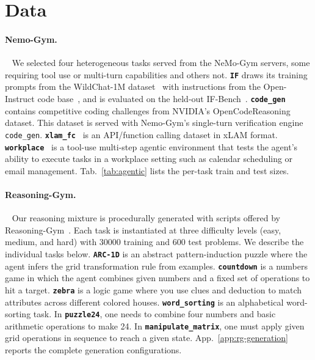 \section{Data}
\label{app:data}
\paragraph{Nemo-Gym.}~\citep{nemogym}
We selected four heterogeneous tasks served from the NeMo-Gym servers, some requiring tool use or multi-turn capabilities and others not.
\textbf{\texttt{IF}} draws its training prompts from the WildChat-1M dataset~\citep{zhao2024wildchat1mchatgptinteraction} with instructions from the Open-Instruct code base~\citep{ahmad2025opencodeinstructlargescaleinstructiontuning}, and is evaluated on the held-out IF-Bench~\citep{ifbench}. \textbf{\texttt{code\_gen}} contains competitive coding challenges from
NVIDIA's OpenCodeReasoning~\citep{ahmad2025opencodereasoningadvancingdatadistillation} dataset. This dataset is served with Nemo-Gym's single-turn verification engine \texttt{code\_gen}.
\textbf{\texttt{xlam\_fc}}~\citep{zhang2024xlamfamilylargeaction} is an API/function calling dataset in xLAM format.
\textbf{\texttt{workplace}}~\citep{nemogym} is a tool-use multi-step agentic environment that tests the agent’s ability to execute tasks in a workplace setting such as calendar scheduling or email management.
Tab.~\ref{tab:agentic} lists the per-task train and test sizes.


\paragraph{Reasoning-Gym.}~\citep{reasoninggym}
Our reasoning mixture is procedurally generated with scripts offered by Reasoning-Gym~\citep{reasoninggym}.
Each task is instantiated at three difficulty levels (easy, medium, and hard) with 30000 training and 600 test problems. We describe the individual tasks below.
\textbf{\texttt{ARC-1D}} is an abstract pattern-induction puzzle where the agent infers the grid transformation rule from examples.
\textbf{\texttt{countdown}} is a numbers game in which the agent combines given numbers and a fixed set of operations to hit a target.
\textbf{\texttt{zebra}} is a logic game where you use clues and deduction to match attributes across different colored houses.
\textbf{\texttt{word\_sorting}} is an alphabetical word-sorting task.
In \textbf{\texttt{puzzle24}}, one needs to combine four numbers and basic arithmetic operations to make 24. 
In \textbf{\texttt{manipulate\_matrix}}, one must apply given grid operations in sequence to reach a given state.
App.~\ref{app:rg-generation} reports the complete generation configurations.


